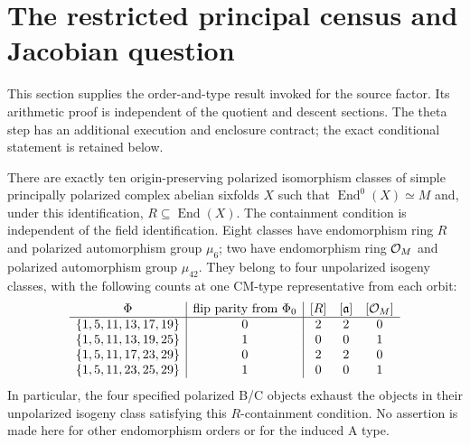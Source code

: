 \section{The restricted principal census and Jacobian question}\label{q:jacobians}
This section supplies the order-and-type result invoked for the source
factor. Its arithmetic proof is independent of the quotient and descent
sections. The theta step has an additional execution and enclosure
contract; the exact conditional statement is retained below.

\begin{theorem}
\label{pp:thm:tenprincipal}
There are exactly ten origin-preserving polarized isomorphism classes of
simple principally polarized complex abelian sixfolds $X$ such that
$\operatorname{End}^0(X)\simeq M$ and, under this identification,
$R\subseteq\operatorname{End}(X)$. The containment condition is independent
of the field identification. Eight classes have endomorphism ring $R$
and polarized automorphism group $\mu_6$; two have endomorphism ring
$\mathcal O_M$ and polarized automorphism group $\mu_{42}$. They belong to four
unpolarized isogeny classes, with the following counts at one CM-type
representative from each orbit:
\[
\begin{array}{c|c|ccc}
\Phi&\text{flip parity from }\Phi_0 &[R]&[\mathfrak a]&[\mathcal O_M]\\ \hline
\{1,5,11,13,17,19\}&0&2&2&0\\
\{1,5,11,13,19,25\}&1&0&0&1\\
\{1,5,11,17,23,29\}&0&2&2&0\\
\{1,5,11,23,25,29\}&1&0&0&1
\end{array}
\]
In particular, the four specified polarized B/C objects exhaust the
objects in their unpolarized isogeny class satisfying this $R$-containment
condition. No assertion is made here for other endomorphism orders or
for the induced A type.
\end{theorem}
